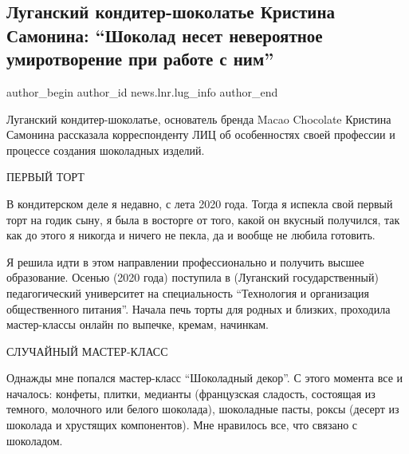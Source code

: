  
 
 
 
 
 
\subsection{Луганский кондитер-шоколатье Кристина Самонина: \enquote{Шоколад несет невероятное умиротворение при работе с ним}}
\label{sec:25_09_2021.stz.news.lnr.lug_info.1.shokolad}
 
\ifcmt
 author_begin
   author_id news.lnr.lug_info
 author_end
\fi

\begin{zznagolos}
Луганский кондитер-шоколатье, основатель бренда Macao Chocolate Кристина
Самонина рассказала корреспонденту ЛИЦ об особенностях своей профессии и
процессе создания шоколадных изделий. 
\end{zznagolos}

ПЕРВЫЙ ТОРТ

В кондитерском деле я недавно, с лета 2020 года. Тогда я испекла свой первый
торт на годик сыну, я была в восторге от того, какой он вкусный получился, так
как до этого я никогда и ничего не пекла, да и вообще не любила готовить.


Я решила идти в этом направлении профессионально и получить высшее образование.
Осенью (2020 года) поступила в (Луганский государственный) педагогический
университет на специальность \enquote{Технология и организация общественного питания}.
Начала печь торты для родных и близких, проходила мастер-классы онлайн по
выпечке, кремам, начинкам.

СЛУЧАЙНЫЙ МАСТЕР-КЛАСС

Однажды мне попался мастер-класс \enquote{Шоколадный декор}. С этого момента все и
началось: конфеты, плитки, медианты (французская сладость, состоящая из
темного, молочного или белого шоколада), шоколадные пасты, роксы (десерт из
шоколада и хрустящих компонентов). Мне нравилось все, что связано с шоколадом.

